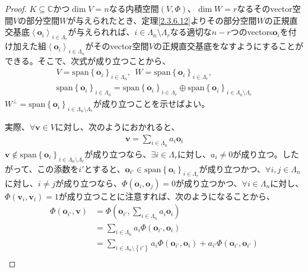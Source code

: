 \documentclass[dvipdfmx]{jsarticle}
\begin{document}
\begin{proof}
$K \subseteq \mathbb{C}$かつ$\dim V = n$なる内積空間$(V,\varPhi )$、$\dim W = r$なるそのvector空間$V$の部分空間$W$が与えられたとき、定理\ref{2.3.6.12}よりその部分空間$W$の正規直交基底$\left\langle \mathbf{o}_{i} \right\rangle_{i \in \varLambda_{r}}$が与えられれば、$i \in \varLambda_{n} \setminus \varLambda_{r}$なる適切な$n - r$つのvectors$\mathbf{o}_{i}$を付け加えた組$\left\langle \mathbf{o}_{i} \right\rangle_{i \in \varLambda_{n}}$がそのvector空間$V$の正規直交基底をなすようにすることができる。そこで、次式が成り立つことから、
\begin{align*}
V = \mathrm{span}\left\{ \mathbf{o}_{i} \right\}_{i \in \varLambda_{n}},\ \ W = \mathrm{span}\left\{ \mathbf{o}_{i} \right\}_{i \in \varLambda_{r}},\\
\mathrm{span}\left\{ \mathbf{o}_{i} \right\}_{i \in \varLambda_{n}} = \mathrm{span}\left\{ \mathbf{o}_{i} \right\}_{i \in \varLambda_{r}} \oplus \mathrm{span}\left\{ \mathbf{o}_{i} \right\}_{i \in \varLambda_{n} \setminus \varLambda_{r}}
\end{align*}
$W^{\bot} = \mathrm{span}\left\{ \mathbf{o}_{i} \right\}_{i \in \varLambda_{n} \setminus \varLambda_{r}}$が成り立つことを示せばよい。\par
実際、$\forall\mathbf{v} \in V$に対し、次のようにおかれると、
\begin{align*}
\mathbf{v} = \sum_{i \in \varLambda_{n}} {a_{i}\mathbf{o}_{i}}
\end{align*}
$\mathbf{v} \notin \mathrm{span}\left\{ \mathbf{o}_{i} \right\}_{i \in \varLambda_{n} \setminus \varLambda_{r}}$が成り立つなら、$\exists i \in \varLambda_{r}$に対し、$a_{i} \neq 0$が成り立つ。したがって、この添数を$i'$とすると、$\mathbf{o}_{i'} \in \mathrm{span}\left\{ \mathbf{o}_{i} \right\}_{i \in \varLambda_{r}}$が成り立つかつ、$\forall i,j \in \varLambda_{n}$に対し、$i \neq j$が成り立つなら、$\varPhi \left( \mathbf{o}_{i},\mathbf{o}_{j} \right) = 0$が成り立つかつ、$\forall i \in \varLambda_{n}$に対し、$\varPhi \left( \mathbf{v}_{i},\mathbf{v}_{i} \right) = 1$が成り立つことに注意すれば、次のようになることから、
\begin{align*}
\varPhi \left( \mathbf{o}_{i'},\mathbf{v} \right) &= \varPhi \left( \mathbf{o}_{i'},\sum_{i \in \varLambda_{n}} {a_{i}\mathbf{o}_{i}} \right)\\
&= \sum_{i \in \varLambda_{n}} {a_{i}\varPhi \left( \mathbf{o}_{i'},\mathbf{o}_{i} \right)}\\
&= \sum_{i \in \varLambda_{n} \setminus \left\{ i' \right\}} {a_{i}\varPhi \left( \mathbf{o}_{i'},\mathbf{o}_{i} \right)} + a_{i'}\varPhi \left( \mathbf{o}_{i'},\mathbf{o}_{i'} \right)\\

\end{align*}
\end{proof}
\end{document}
